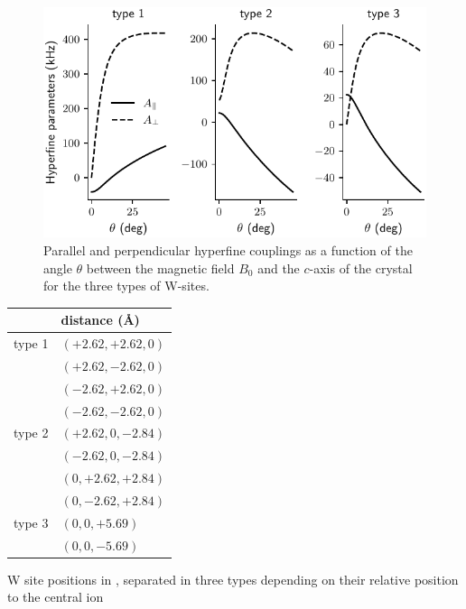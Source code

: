 \begin{figure}
    \includegraphics{chapter2/figures/hyperfine_tensor_vs_angle.pdf}
    \caption[Hyperfine coupling parameter]{Parallel and perpendicular hyperfine couplings as a function of the angle $\theta$ between the magnetic field $B_0$ and the $c$-axis of the crystal for the three types of W-sites.}
\end{figure}


\begin{margintable}[]
\begin{tabular}{l|l}
       & distance (\AA) \\ \hline
type 1 & $(+2.62, +2.62,  0) $           \\
       & $(+2.62, -2.62,  0)  $          \\
       & $(-2.62, +2.62,  0)$            \\
       & $(-2.62, -2.62,  0)$            \\ \hline
type 2 & $(+2.62,  0, -2.84)$            \\
       & $(-2.62,  0, -2.84)$            \\
       & $(0, +2.62, +2.84)$             \\
       & $(0, -2.62, +2.84)$             \\ \hline
type 3 & $(0, 0, +5.69)$                 \\
       & $(0, 0, -5.69)$                
\end{tabular}
\caption[\W atomic positions]{W site positions in \Ca, separated in three types depending on their relative position to the central \Er ion}
\end{margintable}

